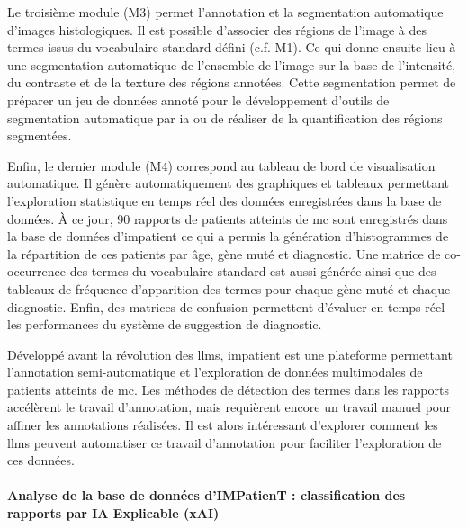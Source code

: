 Le troisième module (M3) permet l’annotation et la segmentation automatique d’images histologiques. Il est possible d’associer des régions de l’image à des termes issus du vocabulaire standard défini (c.f. M1). Ce qui donne ensuite lieu à une segmentation automatique de l’ensemble de l’image sur la base de l’intensité, du contraste et de la texture des régions annotées. Cette segmentation permet de préparer un jeu de données annoté pour le développement d’outils de segmentation automatique par \gls{ia} ou de réaliser de la quantification des régions segmentées.

Enfin, le dernier module (M4) correspond au tableau de bord de visualisation automatique. Il génère automatiquement des graphiques et tableaux permettant l’exploration statistique en temps réel des données enregistrées dans la base de données. À ce jour, 90 rapports de patients atteints de \gls{mc} sont enregistrés dans la base de données d’\gls{impatient} ce qui a permis la génération d’histogrammes de la répartition de ces patients par âge, gène muté et diagnostic. Une matrice de co-occurrence des termes du vocabulaire standard est aussi générée ainsi que des tableaux de fréquence d’apparition des termes pour chaque gène muté et chaque diagnostic. Enfin, des matrices de confusion permettent d’évaluer en temps réel les performances du système de suggestion de diagnostic.

Développé avant la révolution des \gls{llms}, \gls{impatient} est une plateforme permettant l’annotation semi-automatique et l’exploration de données multimodales de patients atteints de \gls{mc}. Les méthodes de détection des termes dans les rapports accélèrent le travail d’annotation, mais requièrent encore un travail manuel pour affiner les annotations réalisées. Il est alors intéressant d’explorer comment les \gls{llms} peuvent automatiser ce travail d’annotation pour faciliter l’exploration de ces données.



\paragraph{\textbf{Analyse de la base de données d’IMPatienT : classification des rapports par IA Explicable (xAI)}}\mbox{}\\

